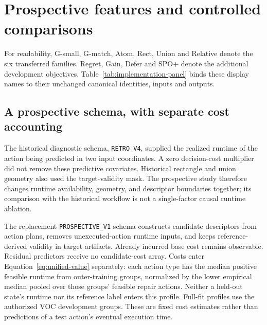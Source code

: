 \section{Prospective features and controlled comparisons}
\label{sec:design}

For readability, G-small, G-match, Atom, Rect, Union and Relative denote the
six transferred families. Regret, Gain, Defer and SPO+ denote the additional
development objectives. Table~\ref{tab:implementation-panel} binds these
display names to their unchanged canonical identities, inputs and outputs.

\subsection{A prospective schema, with separate cost accounting}
The historical diagnostic schema, \texttt{RETRO\_V4}, supplied the realized
runtime of the action being predicted in two input coordinates. A zero
decision-cost multiplier did not remove these predictive covariates.
Historical rectangle and union geometry also used the target-validity mask.
The prospective study therefore changes runtime availability, geometry, and
descriptor boundaries together; its comparison with the historical workflow
is not a single-factor causal runtime ablation.

The replacement \texttt{PROSPECTIVE\_V1} schema constructs candidate
descriptors from action plans, removes unexecuted-action runtime inputs, and
keeps reference-derived validity in target artifacts. Already incurred base
cost remains observable. Residual predictors receive no candidate-cost
array. Costs enter Equation~\ref{eq:unified-value} separately: each action
type has the median positive feasible runtime from outer-training groups,
normalized by the lower empirical median pooled over those groups' feasible
repair actions. Neither a held-out state's runtime nor its reference label
enters this profile. Full-fit profiles use the authorized VOC development
groups. These are fixed cost estimates rather than predictions of a test
action's eventual execution time.

